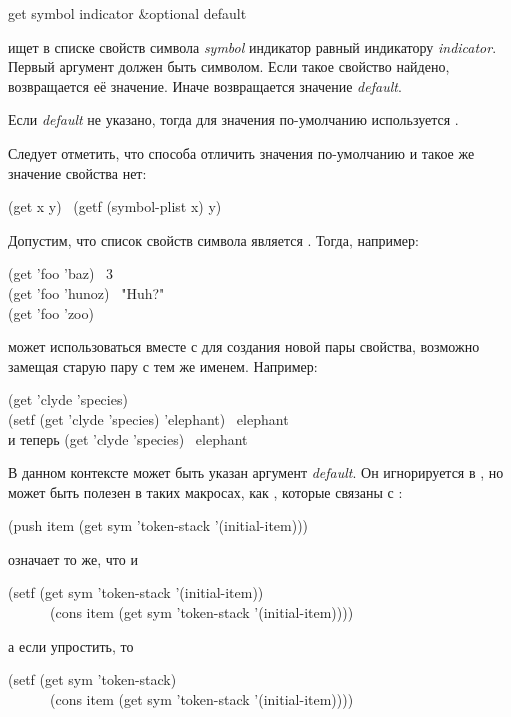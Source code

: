 \begin{defun}[Функция]
get symbol indicator &optional default

 ищет в списке свойств символа \emph{symbol} индикатор равный 
индикатору \emph{indicator}.
Первый аргумент должен быть символом.
Если такое свойство найдено, возвращается её значение. Иначе возвращается
значение \emph{default}.

Если \emph{default} не указано, тогда для значения по-умолчанию используется
{\false}.

Следует отметить, что способа отличить значения по-умолчанию и такое же значение
свойства нет:
\begin{lisp}
(get x y) \EQ\ (getf (symbol-plist x) y)
\end{lisp}
Допустим, что список свойств символа  является .
Тогда, например:
\begin{lisp}
(get 'foo 'baz) \EV\ 3 \\
(get 'foo 'hunoz) \EV\ "Huh?" \\
(get 'foo 'zoo) \EV\ {\false}
\end{lisp}

 может использоваться вместе с  для создания новой пары
свойства, возможно замещая старую пару с тем же именем.
Например:
\begin{lisp}
(get 'clyde 'species) \EV\ {\false} \\
(setf (get 'clyde 'species) 'elephant) \EV\ elephant \\
\textrm{и теперь} (get 'clyde 'species) \EV\ elephant
\end{lisp}
В данном контексте может быть указан аргумент \emph{default}. Он игнорируется в
, но может быть полезен в таких макросах, как , которые
связаны с :
\begin{lisp}
(push item (get sym 'token-stack '(initial-item)))
\end{lisp}
означает то же, что и
\begin{lisp}
(setf (get sym 'token-stack '(initial-item)) \\
~~~~~~(cons item (get sym 'token-stack '(initial-item))))
\end{lisp}
а если упростить, то
\begin{lisp}
(setf (get sym 'token-stack) \\
~~~~~~(cons item (get sym 'token-stack '(initial-item))))
\end{lisp}
\end{defun}


